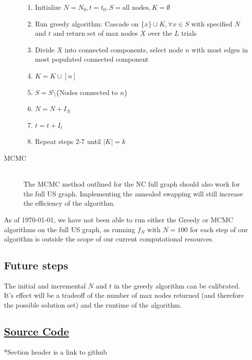 \documentclass{article}
\begin{document}
\begin{description}
				\begin{enumerate}
					\item Initialize $N=N_0,t=t_0,S=\text{all nodes},K=\emptyset$
					\item Run greedy algorithm: Cascade on $\{x\} \cup K, \forall x \in S$ with specified $N$ and $t$ and return set of max nodes $X$ over the $L$ trials
					\item Divide $X$ into connected components, select node $n$ with most edges in most populated connected component
					\item $K = K \cup [n]$
					\item $S = S \setminus \{\text{Nodes connected to }n\}$
					\item $N = N + I_N$
					\item $t = t + I_t$
					\item Repeat steps 2-7 until $|K|=k$
				\end{enumerate}
				
				\item[MCMC] \hfill \\
				
				The MCMC method outlined for the NC full graph should also work for the full US graph. Implementing the annealed swapping will still increase the efficiency of the algorithm. 
				
				\end{description}
				
				As of \today, we have not been able to run either the Greedy or MCMC algorithms on the full US graph, as running $f_N$ with $N = 100$ for each step of our algorithm is outside the scope of our current computational resources. 
				
			
			\subsection{Future steps}
			
			The initial and incremental $N$ and $t$ in the greedy algorithm can be calibrated. It's effect will be a tradeoff of the number of max nodes returned (and therefore the possible solution set) and the runtime of the algorithm.
			
			\subsection{\href{https://github.com/chuckyouliu/Influence-Maximization}{Source Code}}
			
			*Section header is a link to github
			
\end{document}

